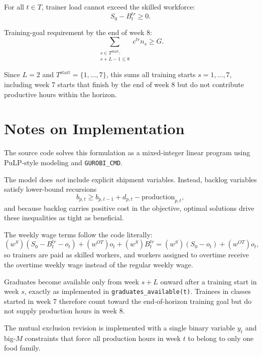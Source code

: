 For all \(t\in T\), trainer load cannot exceed the skilled workforce:
\[
S_0 - B_t^{tr} \ge 0.
\]

Training-goal requirement by the end of week 8:
\[
\sum_{\substack{s\in T^{\text{start}}:\\ s+L-1\le 8}} c^{tr} n_s \ge G.
\]

Since \(L=2\) and \(T^{\text{start}}=\{1,\dots,7\}\), this sums all training starts \(s=1,\dots,7\), including week 7 starts that finish by the end of week 8 but do not contribute productive hours within the horizon.

\section*{Notes on Implementation}

The source code solves this formulation as a mixed-integer linear program using PuLP-style modeling and \texttt{GUROBI\_CMD}.

The model does \emph{not} include explicit shipment variables. Instead, backlog variables satisfy lower-bound recursions
\[
b_{p,t} \ge b_{p,t-1}+d_{p,t}-\text{production}_{p,t},
\]
and because backlog carries positive cost in the objective, optimal solutions drive these inequalities as tight as beneficial.

The weekly wage terms follow the code literally:
\[
(w^S)(S_0-B_t^{tr}-o_t) + (w^{OT})o_t + (w^S)B_t^{tr}
= (w^S)(S_0-o_t) + (w^{OT})o_t,
\]
so trainers are paid as skilled workers, and workers assigned to overtime receive the overtime weekly wage instead of the regular weekly wage.

Graduates become available only from week \(s+L\) onward after a training start in week \(s\), exactly as implemented in \texttt{graduates\_available(t)}. Trainees in classes started in week 7 therefore count toward the end-of-horizon training goal but do not supply production hours in week 8.

The mutual exclusion revision is implemented with a single binary variable \(y_t\) and big-\(M\) constraints that force all production hours in week \(t\) to belong to only one food family.
